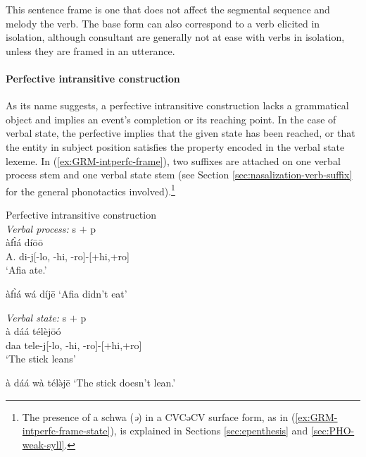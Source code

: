 \begin{exe}
\begin{exe}
\begin{exe}
{\begin{exe}
\begin{exe}
\begin{exe}
\begin{exe}
\begin{exe}
\begin{exe}
\begin{exe}
\begin{xlist}
\begin{exe}
\begin{exe}
\begin{exe}
\begin{exe}
\begin{exe}
\begin{exe}
\begin{exe}
\begin{exe}
\begin{exe}
\begin{exe}
\begin{exe}
\begin{exe}
\begin{exe}
 This sentence frame is one that does not affect the segmental sequence and 
melody the verb. The base form can also correspond  to a  verb elicited in 
isolation, although consultant are generally not at ease with verbs in 
isolation, unless they are framed in an utterance.

\paragraph{Perfective intransitive construction}
\label{sec:GRM-verb-perf-intran}

As its name suggests, a  perfective 
intransitive construction  lacks a 
grammatical
object and implies an event's completion or its 
reaching point.  In the case of verbal state,
the  perfective  implies that the given state has been reached, 
or 
that the entity in subject position   satisfies the property encoded in
the verbal state lexeme. In 
(\ref{ex:GRM-intperfc-frame}),  two suffixes 
are
attached on  one verbal process stem and one  verbal state 
stem (see Section \ref{sec:nasalization-verb-suffix}
for the general phonotactics involved).\footnote{The presence of  a schwa
({\it ə}) in a CVCəCV surface form, as in (\ref{ex:GRM-intperfc-frame-state}), 
is explained in Sections \ref{sec:epenthesis} and \ref{sec:PHO-weak-syll}.}


\ea\label{ex:GRM-intperfc-frame}{\rm Perfective intransitive construction}\\


\ea\label{ex:GRM-intperfc-frame-process}{{\it  Verbal process:} {\sc s}  $+$
{\sc p} }\\
\gll àfɪ̀á díōō\\
A. {di-j[{\sc -lo, -hi, -ro}]-[{\sc +hi,+ro}]}\\

\glt `Afia ate.'

\ex  àfɪ̀á wá díjē `Afia didn't eat'

\ex\label{ex:GRM-intperfc-frame-state}{{\it  Verbal state:} {\sc s}  $+$ {\sc p}
}\\
\gll à dáá télèjōó\\
{\art} daa  {tele-j[{\sc -lo, -hi, -ro}]-[{\sc +hi,+ro}]}\\
\glt `The stick leans'

\ex à dáá wà télə̀jē `The stick doesn't lean.' %

\z 
 \z


\end{exe}
\end{exe}
\end{exe}
\end{exe}
\end{exe}
\end{exe}
\end{exe}
\end{exe}
\end{exe}
\end{exe}
\end{exe}
\end{exe}
\end{exe}
\end{xlist}
\end{exe}
\end{exe}
\end{exe}
\end{exe}
\end{exe}
\end{exe}
\end{exe}}
\end{exe}
\end{exe}
\end{exe}
